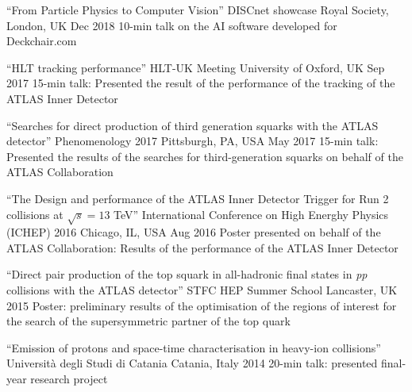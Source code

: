 \begin{cventries}
  \cventry
    {``From Particle Physics to Computer Vision''}
    {DISCnet showcase}
    {Royal Society, London, UK}
    {Dec 2018}
    {10-min talk on the AI software developed for Deckchair.com}

  \cventry
    {``HLT tracking performance''}
    {HLT-UK Meeting}
    {University of Oxford, UK}
    {Sep 2017}
    {15-min talk: Presented the result of the performance of the tracking of the ATLAS Inner Detector }

  \cventry
    {``Searches for direct production of third generation squarks with the ATLAS detector''}  
    {Phenomenology 2017}
    {Pittsburgh, PA, USA}
    {May 2017}
    {15-min talk: Presented the results of the searches for third-generation squarks on behalf of the ATLAS Collaboration}

  \cventry
    {``The Design and performance of the ATLAS Inner Detector Trigger for Run 2 collisions at $\sqrt{s} = 13$ TeV''}
    {International Conference on High Energhy Physics (ICHEP) 2016}
    {Chicago, IL, USA}
    {Aug 2016}
    {Poster presented on behalf of the ATLAS Collaboration: Results of the performance of the ATLAS Inner Detector}

  \cventry
    {``Direct pair production of the top squark in all-hadronic final states in \emph{pp} collisions with the ATLAS detector''}
    {STFC HEP Summer School}
    {Lancaster, UK}
    {2015}
    {Poster: preliminary results of the optimisation of the regions of interest for the search of the supersymmetric partner of the top quark}

  \cventry
    {``Emission of protons and space-time characterisation in heavy-ion collisions''}
    {Università degli Studi di Catania}
    {Catania, Italy}
    {2014}
    {20-min talk: presented final-year research project}

\end{cventries}